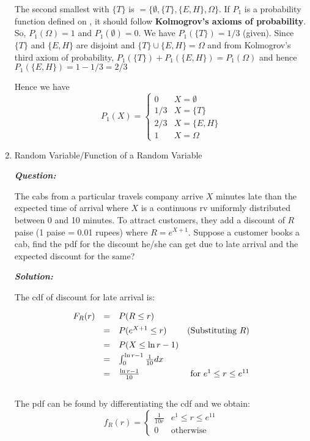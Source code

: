 \documentclass[12pt, oneside]{article}
\begin{document}
\begin{enumerate}
\begin{enumerate}[label=(\roman*)]
\end{enumerate}

The second smallest \sigmafield with $\{T\}$ is  $ = \{\emptyset,\{T\},\{E,H\},\Omega\}$. If $P_1$ is a probability function defined on , it should follow \textbf{Kolmogrov's axioms of probability}. So, $P_1(\Omega) = 1$ and $P_1(\emptyset) = 0$. We have $P_1(\{T\}) = 1/3$ (given). Since $\{T\}$ and $\{E,H\}$ are disjoint and $\{T\} \cup \{E,H\} = \Omega$ and from Kolmogrov's third axiom of probability, $P_1(\{T\}) + P_1(\{E,H\}) = P_1(\Omega)$ and hence $P_1(\{E,H\}) = 1 - 1/3 = 2/3$

Hence we have 
\[ P_1(X) = 
\begin{cases}
0 & X = \emptyset \\
1/3 & X = \{T\} \\
2/3 & X = \{E,H\} \\
1 & X = \Omega
\end{cases}
\]

\newpage

\item Random Variable/Function of a Random Variable

\textbf{\textit{Question:}}

The cabs from a particular travels company arrive $X$ minutes late than the expected time of arrival where $X$ is a continuous rv uniformly distributed between 0 and 10 minutes. To attract customers, they add a discount of $R$ paise (1 paise = 0.01 rupees) where $R = e^{X+1}$. Suppose a customer books a cab, find the pdf for the discount he/she can get due to late arrival and the expected discount for the same?

\textbf{\textit{Solution:}}

The cdf of discount for late arrival is:
        \[\def\arraystretch{1.4}
            \begin{array}{lclr}
                F_R(r) & = & P(R \le r) & ~ \\
                ~ & = & P(e^{X+1} \le r) & \text{(Substituting }R\text{)} \\
                ~ & = & P(X \le \ln r - 1) & ~  \\
                ~ & = & \int_0^{\ln r - 1} \frac{1}{10} dx & ~  \\
                ~ & = & \frac{\ln r - 1}{10} & \text{for } e^1 \le r \le e^{11}
            \end{array}
        \]\\

The pdf can be found by differentiating the cdf and we obtain:
        \[ f_R(r) =
            \begin{cases}
                \frac{1}{10r}   & e^1 \le r \le e^{11} \\
                0               & \text{otherwise}
            \end{cases}
        \]


\end{enumerate}
\end{document}
